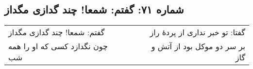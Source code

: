 \begin{center}
\section*{شماره ۷۱: گفتم: شمعا! چند گدازی مگداز}
\label{sec:071}
\begin{longtable}{l p{0.5cm} r}
گفتم: شمعا! چند گدازی مگداز
&&
گفتا: تو خبر نداری از پردهٔ راز
\\
چون نگدازد کسی که او را همه شب
&&
بر سر دو موکل بود از آتش و گاز
\\
\end{longtable}
\end{center}

